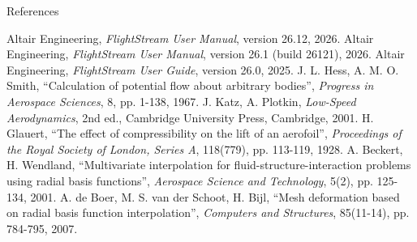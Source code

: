 \documentclass[aspectratio=169,11pt]{beamer}
\begin{document}
\begin{frame}{References}
\begin{reflist}
   
   \recordsref
   Altair Engineering, \emph{FlightStream User Manual}, version 26.12, 2026.
   Altair Engineering, \emph{FlightStream User Manual}, version 26.1 (build 26121), 2026.
   Altair Engineering, \emph{FlightStream User Guide}, version 26.0, 2025.
   J. L. Hess, A. M. O. Smith, ``Calculation of potential flow about
        arbitrary bodies'', \emph{Progress in Aerospace Sciences}, 8,
        pp. 1-138, 1967.
   J. Katz, A. Plotkin, \emph{Low-Speed Aerodynamics}, 2nd ed.,
        Cambridge University Press, Cambridge, 2001.
   H. Glauert, ``The effect of compressibility on the lift of an
        aerofoil'', \emph{Proceedings of the Royal Society of London, Series
        A}, 118(779), pp. 113-119, 1928.
   A. Beckert, H. Wendland, ``Multivariate interpolation for
        fluid-structure-interaction problems using radial basis functions'',
        \emph{Aerospace Science and Technology}, 5(2), pp. 125-134, 2001.
   A. de Boer, M. S. van der Schoot, H. Bijl, ``Mesh deformation based
        on radial basis function interpolation'', \emph{Computers and
        Structures}, 85(11-14), pp. 784-795, 2007.
\end{reflist}
\end{frame}
\end{document}
